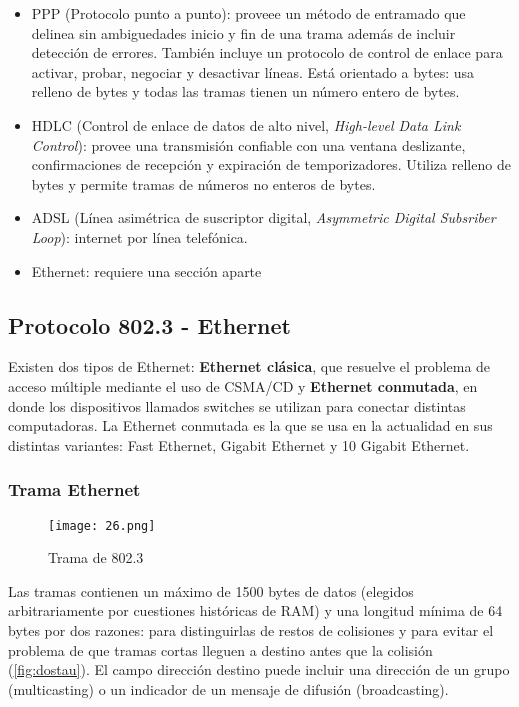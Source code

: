 \documentclass{book}
\begin{document}
	\begin{itemize}
		\item PPP (Protocolo punto a punto): proveee un método de entramado que delinea sin ambiguedades inicio y fin de una trama además de incluir detección de errores. También incluye un protocolo de control de enlace para activar, probar, negociar y desactivar líneas. Está orientado a bytes: usa relleno de bytes y todas las tramas tienen un número entero de bytes.
		
		\item HDLC (Control de enlace de datos de alto nivel, \textit{High-level Data Link Control}): provee una transmisión confiable con una ventana deslizante, confirmaciones de recepción y expiración de temporizadores. Utiliza relleno de bytes y permite tramas de números no enteros de bytes.
		
		\item ADSL (Línea asimétrica de suscriptor digital, \textit{Asymmetric Digital Subsriber Loop}): internet por línea telefónica.
		
		\item Ethernet: requiere una sección aparte
	\end{itemize}
	
	\subsection{Protocolo 802.3 - Ethernet}
	Existen dos tipos de Ethernet: \textbf{Ethernet clásica}, que resuelve el problema de acceso múltiple mediante el uso de CSMA/CD y \textbf{Ethernet conmutada}, en donde los dispositivos llamados switches se utilizan para conectar distintas computadoras. La Ethernet conmutada es la que se usa en la actualidad en sus distintas variantes: Fast Ethernet, Gigabit Ethernet y 10 Gigabit Ethernet.
	
	\subsubsection{Trama Ethernet}
	\begin{figure}[H]
		\centering
		\texttt{[image: 26.png]}
		\caption{Trama de 802.3}
	\end{figure}
	
	Las tramas contienen un máximo de 1500 bytes de datos (elegidos arbitrariamente por cuestiones históricas de RAM) y una longitud mínima de 64 bytes por dos razones: para distinguirlas de restos de colisiones y para evitar el problema de que tramas cortas lleguen a destino antes que la colisión (\ref{fig:dostau}). El campo dirección destino puede incluir una dirección de un grupo (multicasting) o un indicador de un mensaje de difusión (broadcasting).
	
\end{document}
